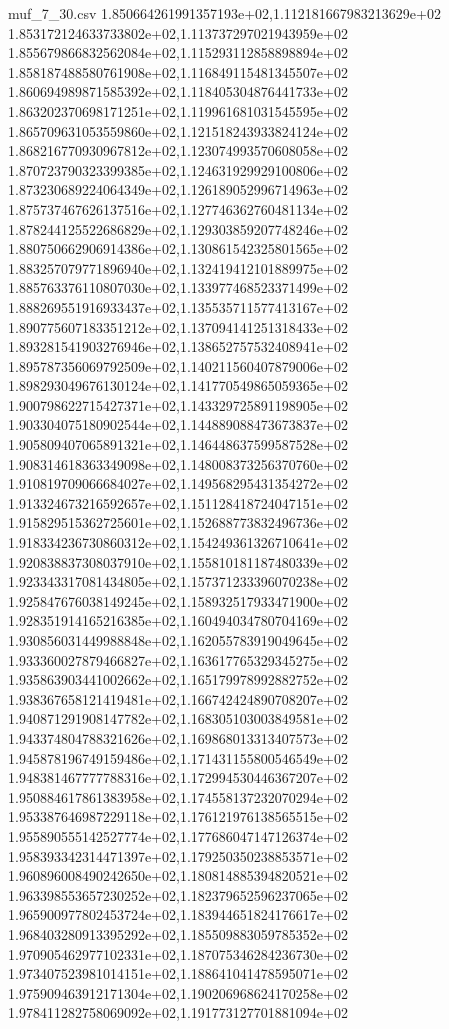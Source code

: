 \begin{filecontents*}{muf_7_30.csv}
1.850664261991357193e+02,1.112181667983213629e+02
1.853172124633733802e+02,1.113737297021943959e+02
1.855679866832562084e+02,1.115293112858898894e+02
1.858187488580761908e+02,1.116849115481345507e+02
1.860694989871585392e+02,1.118405304876441733e+02
1.863202370698171251e+02,1.119961681031545595e+02
1.865709631053559860e+02,1.121518243933824124e+02
1.868216770930967812e+02,1.123074993570608058e+02
1.870723790323399385e+02,1.124631929929100806e+02
1.873230689224064349e+02,1.126189052996714963e+02
1.875737467626137516e+02,1.127746362760481134e+02
1.878244125522686829e+02,1.129303859207748246e+02
1.880750662906914386e+02,1.130861542325801565e+02
1.883257079771896940e+02,1.132419412101889975e+02
1.885763376110807030e+02,1.133977468523371499e+02
1.888269551916933437e+02,1.135535711577413167e+02
1.890775607183351212e+02,1.137094141251318433e+02
1.893281541903276946e+02,1.138652757532408941e+02
1.895787356069792509e+02,1.140211560407879006e+02
1.898293049676130124e+02,1.141770549865059365e+02
1.900798622715427371e+02,1.143329725891198905e+02
1.903304075180902544e+02,1.144889088473673837e+02
1.905809407065891321e+02,1.146448637599587528e+02
1.908314618363349098e+02,1.148008373256370760e+02
1.910819709066684027e+02,1.149568295431354272e+02
1.913324673216592657e+02,1.151128418724047151e+02
1.915829515362725601e+02,1.152688773832496736e+02
1.918334236730860312e+02,1.154249361326710641e+02
1.920838837308037910e+02,1.155810181187480339e+02
1.923343317081434805e+02,1.157371233396070238e+02
1.925847676038149245e+02,1.158932517933471900e+02
1.928351914165216385e+02,1.160494034780704169e+02
1.930856031449988848e+02,1.162055783919049645e+02
1.933360027879466827e+02,1.163617765329345275e+02
1.935863903441002662e+02,1.165179978992882752e+02
1.938367658121419481e+02,1.166742424890708207e+02
1.940871291908147782e+02,1.168305103003849581e+02
1.943374804788321626e+02,1.169868013313407573e+02
1.945878196749159486e+02,1.171431155800546549e+02
1.948381467777788316e+02,1.172994530446367207e+02
1.950884617861383958e+02,1.174558137232070294e+02
1.953387646987229118e+02,1.176121976138565515e+02
1.955890555142527774e+02,1.177686047147126374e+02
1.958393342314471397e+02,1.179250350238853571e+02
1.960896008490242650e+02,1.180814885394820521e+02
1.963398553657230252e+02,1.182379652596237065e+02
1.965900977802453724e+02,1.183944651824176617e+02
1.968403280913395292e+02,1.185509883059785352e+02
1.970905462977102331e+02,1.187075346284236730e+02
1.973407523981014151e+02,1.188641041478595071e+02
1.975909463912171304e+02,1.190206968624170258e+02
1.978411282758069092e+02,1.191773127701881094e+02

\end{filecontents*}
